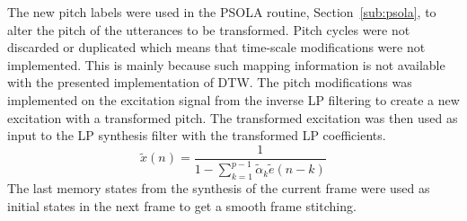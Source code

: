 The new pitch labels were used in the PSOLA routine, Section~\ref{sub:psola}, to alter the pitch of the utterances to be transformed. Pitch cycles were not discarded or duplicated which means that time-scale modifications were not implemented. This is mainly because such mapping information is not available with the presented implementation of DTW. The pitch modifications was implemented on the excitation signal from the inverse LP filtering to create a new excitation with a transformed pitch. The transformed excitation was then used as input to the LP synthesis filter with the transformed LP coefficients. 
\begin{equation}
	\tilde{x}(n) = \frac{1}{1 - \sum_{k=1}^{p-1} \tilde{\alpha}_k \tilde{e}(n-k)}
\end{equation}
The last memory states from the synthesis of the current frame were used as initial states in the next frame to get a smooth frame stitching.



